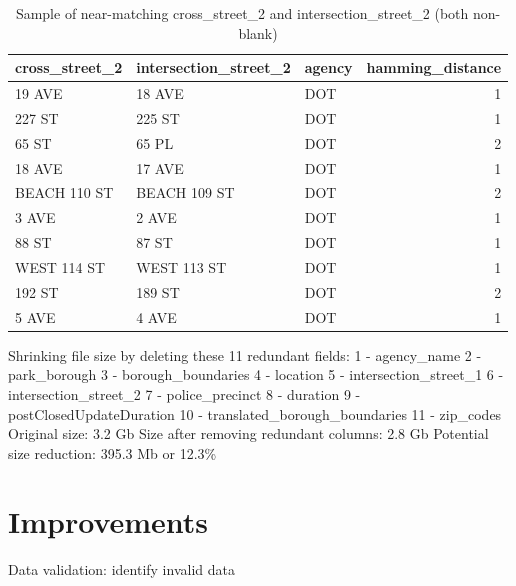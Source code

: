 \documentclass[12pt, titlepage]{article}
\begin{document}
\begin{table}[H]
    \centering
    \footnotesize
    \begin{tabular}{l l l r}
        \toprule
        \textbf{cross\_street\_2} & \textbf{intersection\_street\_2} & \textbf{agency} & \textbf{hamming\_distance} \\
        \midrule
        19 AVE         & 18 AVE                & DOT    & 1 \\
        227 ST         & 225 ST                & DOT    & 1 \\
        65 ST          & 65 PL                 & DOT    & 2 \\
        18 AVE         & 17 AVE                & DOT    & 1 \\
        BEACH 110 ST   & BEACH 109 ST          & DOT    & 2 \\
        3 AVE          & 2 AVE                 & DOT    & 1 \\
        88 ST          & 87 ST                 & DOT    & 1 \\
        WEST 114 ST    & WEST 113 ST           & DOT    & 1 \\
        192 ST         & 189 ST                & DOT    & 2 \\
        5 AVE          & 4 AVE                 & DOT    & 1 \\
        \bottomrule
    \end{tabular}
    \caption{Sample of near-matching cross\_street\_2 and intersection\_street\_2 (both non-blank)}
    \label{tab:near_matching_cross_intersection_2}
\end{table}

Shrinking file size by deleting these 11 redundant fields:
     1 - agency\_name 
     2 - park\_borough 
     3 - borough\_boundaries 
     4 - location 
     5 - intersection\_street\_1 
     6 - intersection\_street\_2 
     7 - police\_precinct 
     8 - duration 
     9 - postClosedUpdateDuration 
     10 - translated\_borough\_boundaries 
     11 - zip\_codes 
Original size: 3.2 Gb 
Size after removing redundant columns: 2.8 Gb 
Potential size reduction: 395.3 Mb or 12.3\%



\section{Improvements} \label{sec:improvements}

Data validation: identify invalid data
\end{document}
